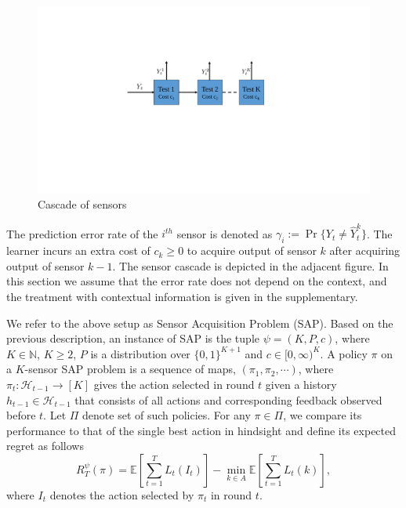\documentclass[11pt]{article} %
\begin{document}
\begin{figure}
	\vspace{-.5cm}
	\centering
	\includegraphics[scale=.6]{cascade.pdf}
	\caption{Cascade of sensors
	}\label{wrap-fig:1}
	\vspace{-.5cm}
\end{figure} 

The prediction error rate of the $i^{th}$ sensor is denoted as $\gamma_i:=\Pr\{Y_t\neq \hat{Y}^k_t\}$. The learner incurs an extra cost of $c_k\geq 0$ to acquire output of sensor $k$ after acquiring output of sensor $k-1$. The sensor cascade is depicted in the adjacent figure. In this section we assume that the error rate does not depend on the  context, and the treatment with contextual information is given in the supplementary. 
\fi

We refer to the above setup as Sensor Acquisition Problem (SAP).
Based on the previous description, an instance of SAP is the tuple $\psi = (K,P,c)$, where $K\in \mathbb{N}$, $K\ge 2$,
$P$ is a distribution over $\{0,1\}^{K+1}$ and $c\in [0,\infty)^K$. 
 A policy $\pi$ on a $K$-sensor SAP problem
 is a sequence of maps, $(\pi_1, \pi_2, \cdots)$, where
 $\pi_t : \mathcal{H}_{t-1}\rightarrow [K]$ gives the action selected in round $t$
 given a history $h_{t-1}\in \mathcal{H}_{t-1}$ that consists of all actions and corresponding feedback observed before $t$. 
 Let $\Pi$ denote set of such policies. 
 For any $\pi \in \Pi$, we compare its performance to that of the single best action in hindsight 
 and define its expected regret as follows
\begin{equation}
R^\psi_T(\pi)= \mathbb{E}\left[\sum_{t=1}^T L_t(I_t)\right]-\min_{k\in A}\mathbb{E}\left[\sum_{t=1}^T L_t(k)\right],
\end{equation}
where $I_t$ denotes the action selected by $\pi_t$ in round $t$.
\end{document}
